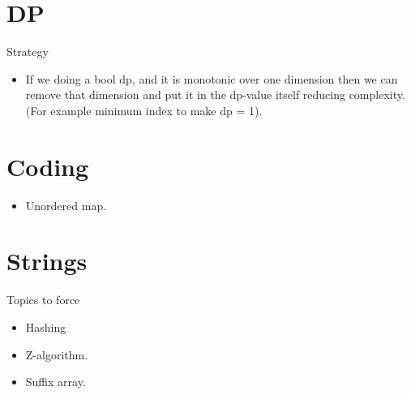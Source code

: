 \documentclass[../Notes.tex]{subfiles}
\begin{document}
\section{DP}
Strategy
\begin{itemize}
	\item If we doing a bool dp, and it is monotonic over one dimension then we can remove that dimension and put it in the dp-value itself reducing complexity.(For example minimum index to make dp = 1).
\end{itemize}

\section{Coding}
\begin{itemize}
	\item Unordered map.
\end{itemize}

\section{Strings}
Topics to force
\begin{itemize}
	\item Hashing
	\item Z-algorithm.
	\item Suffix array.
\end{itemize}
\end{document}
